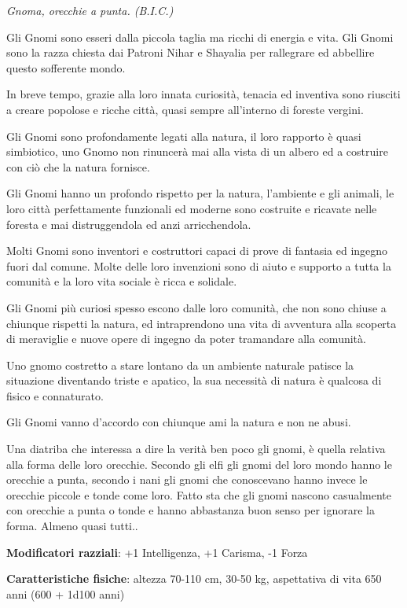 \begin{multicols}{2}
\begin{center}
\emph{Gnoma, orecchie a punta. (B.I.C.)}
\end{center}

Gli Gnomi sono esseri dalla piccola taglia ma ricchi di energia e vita. Gli Gnomi sono la razza chiesta dai Patroni Nihar e Shayalia per rallegrare ed abbellire questo sofferente mondo.

In breve tempo, grazie alla loro innata curiosità, tenacia ed inventiva sono riusciti a creare popolose e ricche città, quasi sempre all'interno di foreste vergini.

Gli Gnomi sono profondamente legati alla natura, il loro rapporto è quasi simbiotico, uno Gnomo non rinuncerà mai alla vista di un albero ed a costruire con ciò che la natura fornisce.

Gli Gnomi hanno un profondo rispetto per la natura, l'ambiente e gli animali, le loro città perfettamente funzionali ed moderne sono costruite e ricavate nelle foresta e mai distruggendola ed anzi arricchendola.

Molti Gnomi sono inventori e costruttori capaci di prove di fantasia ed ingegno fuori dal comune. Molte delle loro invenzioni sono di aiuto e supporto a tutta la comunità e la loro vita sociale è ricca e solidale.

Gli Gnomi più curiosi spesso escono dalle loro comunità, che non sono chiuse a chiunque rispetti la natura, ed intraprendono una vita di avventura alla scoperta di meraviglie e nuove opere di ingegno da poter tramandare alla comunità.

Uno gnomo costretto a stare lontano da un ambiente naturale patisce la situazione diventando triste e apatico, la sua necessità di natura è qualcosa di fisico e connaturato.

Gli Gnomi vanno d'accordo con chiunque ami la natura e non ne abusi.

Una diatriba che interessa a dire la verità ben poco gli gnomi, è quella relativa alla forma delle loro orecchie. Secondo gli elfi gli gnomi del loro mondo hanno le orecchie a punta, secondo i nani gli gnomi che conoscevano hanno invece le orecchie piccole e tonde come loro. Fatto sta che gli gnomi nascono casualmente con orecchie a punta o tonde e hanno abbastanza buon senso per ignorare la forma. Almeno quasi tutti..

\textbf{Modificatori razziali}: +1 Intelligenza, +1 Carisma, -1 Forza

\textbf{Caratteristiche fisiche}: altezza 70-110 cm, 30-50 kg, aspettativa di vita 650 anni (600 + 1d100 anni)


\end{multicols}
